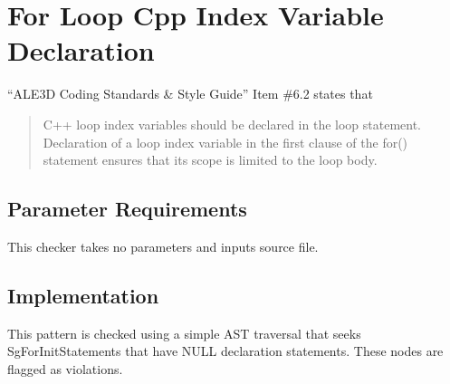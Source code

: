 %
%

\section{For Loop Cpp Index Variable Declaration}
\label{ForLoopCppIndexVariableDeclaration::overview}

``ALE3D Coding Standards \& Style Guide'' Item \#6.2 states that
\begin{quote}
C++ loop index variables should be declared in the loop statement. Declaration of a loop index variable in the first clause of the for() statement ensures that its scope is limited to the loop body.
\end{quote}

\subsection{Parameter Requirements}
This checker takes no parameters and inputs source file.

\subsection{Implementation}
This pattern is checked using a simple AST traversal that seeks SgForInitStatements that have NULL declaration statements. These nodes are flagged as violations.

